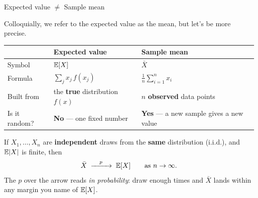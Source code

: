 \documentclass[9pt,english,aspectratio=169]{beamer}
\begin{document}
\begin{frame}{Expected value $\neq$ Sample mean}

  Colloquially, we refer to the expected value as the mean, but let's be more
  precise.

  \vspace{1em}

  \centering
  \renewcommand{\arraystretch}{1.3}
  {
  \begin{tabular}{@{} l p{4.3cm} p{4.9cm} @{}}
    \toprule
     & \textbf{Expected value} & \textbf{Sample mean} \\
    \midrule
    Symbol & $\mathbb{E}[X]$ & $\bar{X}$ \\

    Formula & $\sum_j x_j\, f(x_j)$
            & $\frac{1}{n}\sum_{i=1}^{n} x_i$ \\

    Built from & the \textbf{true} distribution $f(x)$
               & $n$ \textbf{observed} data points \\

    Is it random? & \textbf{No} --- one fixed number
                  & \textbf{Yes} --- a new sample gives a new value \\
    \bottomrule
  \end{tabular}}
  \pause

  \vspace{0.5em}
  \begin{definitionbox}
      If $X_1, \ldots, X_n$ are \textbf{independent} draws from the \textbf{same}
      distribution (i.i.d.), and $\mathbb{E}|X|$ is finite, then
        \[
          \bar{X} \;\xrightarrow{\quad p \quad}\; \mathbb{E}[X]
          \qquad \text{as } n \to \infty.
        \]
      The $p$ over the arrow reads \textit{in probability}: draw enough times and $\bar{X}$ lands within any margin you name of $\mathbb{E}[X]$.
  \end{definitionbox}

\end{frame}
\end{document}
